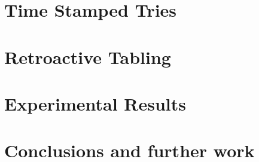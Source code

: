 \documentclass[12pt,a4paper]{report}
\begin{document}
\chapter{Time Stamped Tries}


\chapter{Retroactive Tabling}


\chapter{Experimental Results}


\chapter{Conclusions and further work}

\appendix

  
\renewcommand{\bibname}{References}

{}
\end{document}
